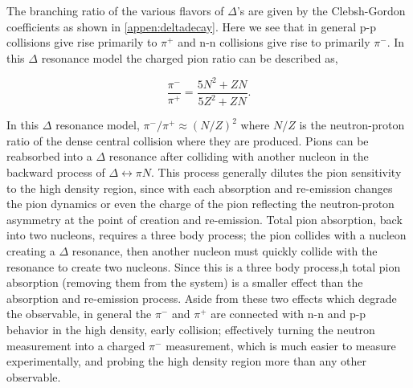 The branching ratio of the various flavors of $\Delta$'s are given by the Clebsh-Gordon coefficients as shown in \ref{appen:deltadecay}. Here we see that in general p-p collisions give rise primarily to  $\pi^+$ and n-n collisions give rise to primarily $\pi^-$. In this $\Delta$ resonance model the charged pion ratio can be described as,

\begin{equation}
\frac{\pi^-}{\pi^+} = \frac{ 5N^2 + ZN }{5Z^2 + ZN}.
\label{eq:deltaModel}
\end{equation}

In this $\Delta$ resonance model, $\pi^-/\pi^+ \approx (N/Z)^2$ where $N/Z$ is the neutron-proton ratio of the dense central collision where they are produced. Pions can be reabsorbed into a $\Delta$ resonance after colliding with another nucleon in the backward process of $\Delta \leftrightarrow \pi N$. This process generally dilutes the pion sensitivity to the high density region, since with each absorption and re-emission changes the pion dynamics or even the charge of the pion reflecting the neutron-proton asymmetry at the point of creation and re-emission. Total pion absorption, back into two nucleons, requires a three body process; the pion collides with a nucleon creating a $\Delta$ resonance, then another nucleon must quickly collide with the resonance to create two nucleons. Since this is a three body process,h total pion absorption (removing them from the system) is a smaller effect than the absorption and re-emission process. Aside from these two effects which degrade the observable, in general the $\pi^-$ and $\pi^+$ are connected with n-n and p-p behavior in the high density, early collision; effectively turning the neutron measurement into a charged $\pi^-$ measurement, which is much easier to measure experimentally, and probing the high density region more than any other observable. 

